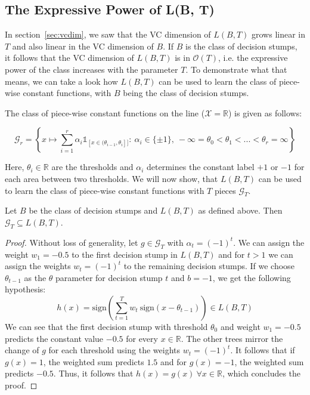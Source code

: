 \subsection{The Expressive Power of L(B, T)}

In section~\ref{sec:vcdim}, we saw that the VC dimension of $L(B, T)$ grows linear in $T$ and also linear
in the VC dimension of
$B$. If $B$ is the class of decision stumps, it follows that the VC dimension
of $L(B, T)$ is in $\mathcal{O}(T)$, i.e. the expressive power of the class increases with the parameter $T$.
To demonstrate what that means, we can take a look how $L(B, T)$ can be used to learn the class of piece-wise constant
functions, with $B$ being the class of decision stumps.

The class of piece-wise constant functions on the line ($\mathcal{X} = \mathbb{R}$) is given as follows:
\begin{linenomath*}
    $$
    \mathcal{G}_r = \left \{ x \mapsto \sum_{i=1}^r \alpha_i \mathds{1}_{[x \in (\theta_{i-1}, \theta_i]]}: \ 
        \alpha_i \in \{\pm 1 \},\  -\infty = \theta_0 < \theta_1 < ... < \theta_r = \infty \right \}
    $$
\end{linenomath*}
Here, $\theta_i \in \mathbb{R}$ are the thresholds and $\alpha_i$ determines the constant label $+1$ or $-1$
for each area between two thresholds. We will now show, that $L(B, T)$ can be used to learn the class
of piece-wise constant functions with $T$ pieces $\mathcal{G}_T$.

\begin{theorem}
\label{thm:piece-wise}
\begin{linenomath*}
	Let $B$ be the class of decision stumps and $L(B, T)$ as defined above.
	Then $\mathcal{G}_T \subseteq L(B, T)$.
\end{linenomath*}
\end{theorem}
\begin{proof}
	Without loss of generality, let $g \in \mathcal{G}_T$ with $\alpha_t = (-1)^t$. We can assign the weight
	$w_1=-0.5$ to the first decision stump in $L(B, T)$ and for $t > 1$ we can assign the weights $w_t = (-1)^t$
	to the remaining decision stumps. If we choose $\theta_{t-1}$ as the $\theta$ parameter for decision
	stump $t$ and $b=-1$, we get the following hypothesis:
	$$
	    h(x) = \text{sign} \left( \sum_{t=1}^T w_t \  \text{sign} (x - \theta_{t-1}) \right) \in L(B, T)
	$$
	We can see that the first decision stump with threshold $\theta_{0}$ and weight $w_1 = -0.5$ predicts the
	constant value $-0.5$ for every $x \in \mathbb{R}$. The other trees mirror the change of $g$ for each threshold
	using the weights $w_t = (-1)^t$. It follows that if $g(x) = 1$, the weighted sum predicts $1.5$ and for
	$g(x) = -1$, the weighted sum predicts $-0.5$. Thus, it follows that $h(x) = g(x)\  \forall x \in \mathbb{R}$,
	which concludes the proof.
\end{proof}

